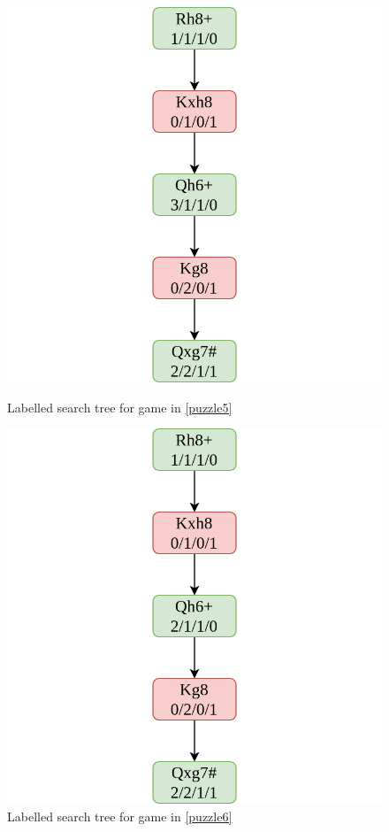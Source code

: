 \begin{figure}[H]
    \begin{minipage}{0.475\textwidth}
        \centering
        \includegraphics[width=\textwidth]{project/img/trees/3.drawio.png}
        \caption{Labelled search tree for game in \ref{puzzle5}}
        \label{tree3}
    \end{minipage}
    \hspace{0.05\textwidth}
    \begin{minipage}{0.475\textwidth}
        \centering
        \includegraphics[width=\textwidth]{project/img/trees/4.drawio.png}
        \caption{Labelled search tree for game in \ref{puzzle6}}
        \label{tree4}
    \end{minipage}
\end{figure}

